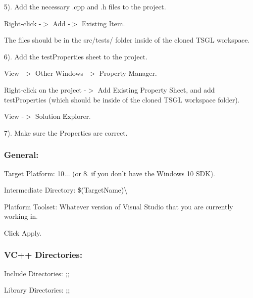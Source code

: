5). Add the necessary {\ttfamily .cpp} and {\ttfamily .h} files to the project.


\begin{DoxyItemize}
\item {\ttfamily Right-\/click -\/$>$ Add -\/$>$ Existing Item}.
\item The files should be in the {\ttfamily src/tests/} folder inside of the cloned T\-S\-G\-L workspace.
\end{DoxyItemize}

6). Add the {\ttfamily test\-Properties} sheet to the project.


\begin{DoxyItemize}
\item {\ttfamily View -\/$>$ Other Windows -\/$>$ Property Manager}.
\item {\ttfamily Right-\/click on the project -\/$>$ Add Existing Property Sheet}, and add {\ttfamily test\-Properties} (which should be inside of the cloned T\-S\-G\-L workspace folder).
\item {\ttfamily View -\/$>$ Solution Explorer}.
\end{DoxyItemize}

7). Make sure the {\ttfamily Properties} are correct.

\subsubsection*{General\-:}


\begin{DoxyItemize}
\item {\ttfamily Target Platform\-:} 10... (or 8. if you don't have the Windows 10 S\-D\-K).
\item {\ttfamily Intermediate Directory\-:} \$(Target\-Name)\textbackslash{}
\item {\ttfamily Platform Toolset\-:} Whatever version of Visual Studio that you are currently working in.
\end{DoxyItemize}

Click {\ttfamily Apply}.

\subsubsection*{V\-C++ Directories\-:}


\begin{DoxyItemize}
\item {\ttfamily Include Directories\-:} ;;
\item {\ttfamily Library Directories\-:} ;;
\end{DoxyItemize}

